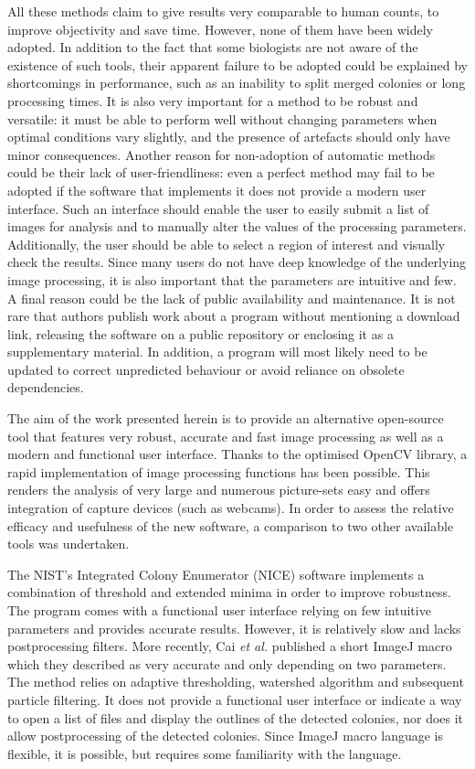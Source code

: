 \documentclass[10pt]{article}
\begin{document}
All these methods claim to give results very comparable to human counts, to improve
objectivity and save time. However, none of them have been widely adopted.
In addition to the fact that some biologists are not aware of the existence of such
tools, their apparent failure to be adopted could be explained by shortcomings
in performance, such as an inability to split merged colonies
or long processing times. It is also very important for a method to be robust and versatile:
it must be able to perform well without changing parameters when optimal conditions vary slightly,
and the presence of artefacts should only have minor consequences.
Another reason for non-adoption of automatic methods could be their lack of
user-friendliness: even a perfect method may fail to be adopted if the software
that implements it does not provide a modern user interface. Such an interface
should enable the user to easily submit a list of images for analysis and to
manually alter the values of the processing parameters. Additionally, the user
should be able to select a region of interest and visually check the results.
Since many users do not have deep knowledge of the underlying image processing, 
it is also important that the parameters are intuitive and few.
A final reason could be the lack of public availability
and maintenance. It is not rare that authors publish work about a
program without mentioning a download link, releasing the software on a public
repository or enclosing it as a supplementary
material\cite{bewes_automated_2008,kachouie_arraycount_2009}.
In addition, a program will most likely need to be updated to correct
unpredicted behaviour or avoid reliance on obsolete dependencies.

The aim of the work presented herein is to provide an alternative open-source tool that
features very robust, accurate and fast image processing as well as a modern and
functional user interface. Thanks to the optimised OpenCV
library\cite{opencv_library}, a rapid implementation of image processing
functions has been possible. This renders the analysis of very large and
numerous picture-sets easy and offers integration of capture devices 
(such as webcams). 
In order to assess the relative efficacy and usefulness of the new software,
a comparison to two other available tools was undertaken.


The NIST's Integrated Colony Enumerator (NICE)\cite{clarke_lowcost_2010}
software
implements a combination of threshold and extended minima in order to improve robustness.
The program comes with a functional user interface relying on few intuitive parameters
and provides accurate results. 
However, it is relatively slow and lacks
postprocessing filters.
More recently, Cai \emph{et al.} published\cite{cai_optimized_2011} a short
ImageJ macro which they described as very accurate and only depending on two parameters.
The method relies on adaptive thresholding, watershed algorithm and subsequent particle filtering.
It does not provide a functional user interface or indicate a way to open a list
of files and display the outlines of the detected colonies, nor does it allow
postprocessing of the detected colonies. 
Since ImageJ macro language is
flexible, it is possible, but requires some familiarity with the language.
\end{document}
